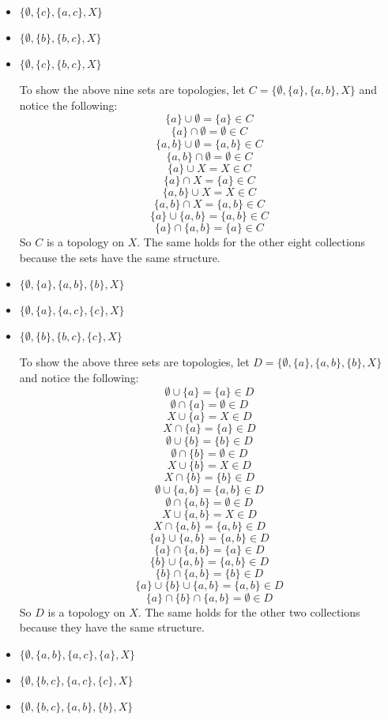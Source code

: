\documentclass[12pt]{article}
\begin{document}
\begin{enumerate}
\begin{itemize}
    \item $\{\emptyset, \{c\}, \{a, c\}, X\}$
    
    \item $\{\emptyset, \{b\}, \{b, c\}, X\}$
    \item $\{\emptyset, \{c\}, \{b, c\}, X\}$
    
    To show the above nine sets are topologies, let $C = \{\emptyset, \{a\}, \{a, b\}, X\}$ and notice the following:
    \[\{a\} \cup \emptyset = \{a\} \in C\]
    \[\{a\} \cap \emptyset = \emptyset \in C\]
    \[\{a,b\} \cup \emptyset = \{a,b\} \in C\]
    \[\{a,b\} \cap \emptyset = \emptyset \in C\]
    \[\{a\} \cup X = X \in C\]
    \[\{a\} \cap X = \{a\} \in C\]
    \[\{a,b\} \cup X = X \in C\]
    \[\{a,b\} \cap X = \{a,b\} \in C\]
    \[\{a\} \cup \{a,b\} = \{a,b\} \in C\]
    \[\{a\} \cap \{a,b\} = \{a\} \in C\]
    So $C$ is a topology on $X$. The same holds for the other eight collections because the sets have the same structure. 
    
    \item $\{\emptyset, \{a\}, \{a,b\}, \{b\}, X\}$ 
    \item $\{\emptyset, \{a\}, \{a, c\}, \{c\}, X\}$ 
    \item $\{\emptyset, \{b\}, \{b, c\}, \{c\}, X\}$ 
    
    To show the above three sets are topologies, let $D = \{\emptyset, \{a\}, \{a,b\}, \{b\}, X\}$ and notice the following:
    \[\emptyset \cup \{a\} = \{a\} \in D\]
    \[\emptyset \cap \{a\} = \emptyset \in D\]
    \[X \cup \{a\} = X \in D\]
    \[X \cap \{a\} = \{a\} \in D\]
    \[\emptyset \cup \{b\} = \{b\} \in D\]
    \[\emptyset \cap \{b\} = \emptyset \in D\]
    \[X \cup \{b\} = X \in D\]
    \[X \cap \{b\} = \{b\} \in D\]
    \[\emptyset \cup \{a,b\} = \{a,b\} \in D\]
    \[\emptyset \cap \{a,b\} = \emptyset \in D\]
    \[X \cup \{a,b\} = X \in D\]
    \[X \cap \{a,b\} = \{a,b\} \in D\]
    \[\{a\} \cup \{a,b\} = \{a,b\} \in D\]
    \[\{a\} \cap \{a,b\} = \{a\} \in D\]
    \[\{b\} \cup \{a,b\} = \{a,b\} \in D\]
    \[\{b\} \cap \{a,b\} = \{b\} \in D\]
    \[\{a\} \cup \{b\} \cup \{a,b\} = \{a,b\} \in D\]
    \[\{a\} \cap \{b\} \cap \{a,b\} = \emptyset \in D\]
    So $D$ is a topology on $X$. The same holds for the other two collections because they have the same structure.
    
    \item $\{\emptyset, \{a, b\}, \{a, c\}, \{a\}, X\}$
    \item $\{\emptyset, \{b, c\}, \{a, c\}, \{c\}, X\}$
    \item $\{\emptyset, \{b, c\}, \{a, b\}, \{b\}, X\}$
    

\end{itemize}
\end{enumerate}
\end{document}
